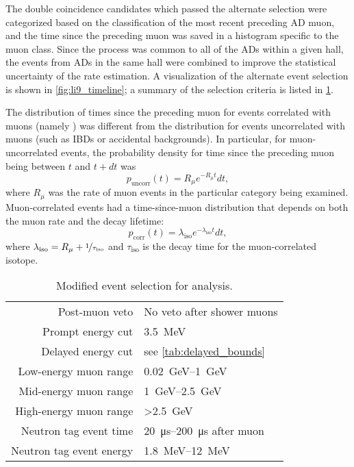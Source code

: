 The double coincidence candidates which passed the alternate selection
were categorized based on the classification
of the most recent preceding AD muon,
and the time since the preceding muon
was saved in a histogram specific to the muon class.
Since the \li{} process was common to all of the ADs within a given hall,
the events from ADs in the same hall were combined
to improve the statistical uncertainty of the rate estimation.
A visualization of the alternate event selection
is shown in \cref{fig:li9_timeline};
a summary of the selection criteria is listed in \cref{tab:li9}.

The distribution of times since the preceding muon
for events correlated with muons (namely \li{})
was different from the distribution for events uncorrelated with muons
(such as IBDs or accidental backgrounds).
In particular, for muon-uncorrelated events,
the probability density for time since the preceding muon
being between $t$ and $t + dt$ was \cite{chris_li9}
\begin{equation}\label{eq:li9_muon_uncorr}
    p_\text{uncorr}(t) = R_\mu e^{-R_\mu t}dt,
\end{equation}
where $R_\mu$ was the rate of muon events in the particular category being examined.
Muon-correlated events had a time-since-muon distribution
that depends on both the muon rate and the decay lifetime:
\begin{equation}\label{eq:li9_muon_corr}
    p_\text{corr}(t) = \lambda_\text{iso} e^{-\lambda_\text{iso} t}dt,
\end{equation}
where $\lambda_\text{iso} = R_\mu + \nicefrac{1}{\tau_\text{iso}}$
and $\tau_\text{iso}$ is the decay time
for the muon-correlated isotope.

\begin{table}[ht]
    \centering
    \caption[\li{}/\he{} event selection]{Modified event selection for \li{} analysis.}
    \label{tab:li9}
    \begin{tabular}[t]{rl}
        \toprule
        Post-muon veto & No veto after shower muons \\
        Prompt energy cut & \SI{3.5}{\MeV} \\
        Delayed energy cut & see \cref{tab:delayed_bounds} \\
        Low-energy muon range & \SIrange{0.02}{1}{\GeV} \\
        Mid-energy muon range & \SIrange{1}{2.5}{\GeV} \\
        High-energy muon range & \SI{>2.5}{\GeV} \\
        Neutron tag event time & \SIrange{20}{200}{\us} after muon \\
        Neutron tag event energy & \SIrange{1.8}{12}{\MeV} \\
        \bottomrule
    \end{tabular}
\end{table}

